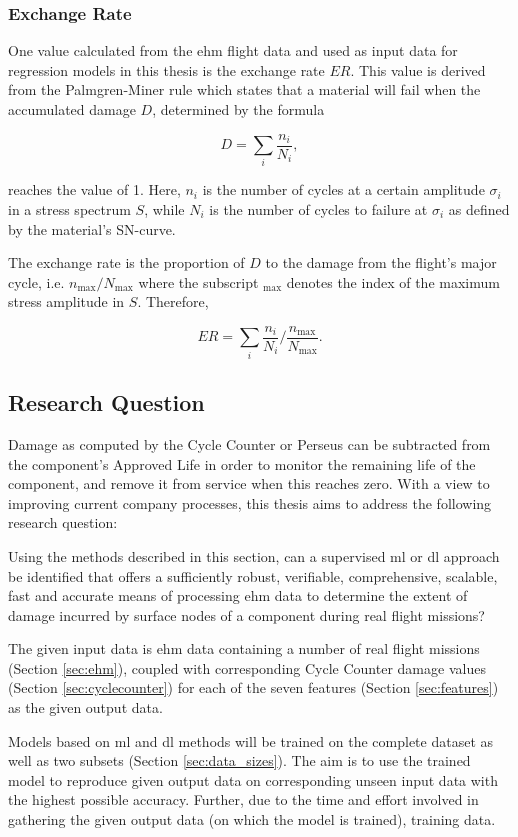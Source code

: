 \subsubsection{Exchange Rate}
One value calculated from the \ac{ehm} flight data and used as input data for regression models in this thesis is the exchange rate \(ER\). This value is derived from the Palmgren-Miner rule \cite[]{palmgren_lebensdauer_1924} which states that a material will fail when the accumulated damage \(D\), determined by the formula

\[
    D = \sum_{i}{\frac{n_i}{N_i}},
\]

reaches the value of 1. Here, \(n_i\) is the number of cycles at a certain amplitude \(\sigma_i\) in a stress spectrum \(S\), while \(N_i\) is the number of cycles to failure at \(\sigma_i\) as defined by the material's SN-curve.

The exchange rate is the proportion of \(D\) to the damage from the flight's major cycle, i.e. \(n_{\text{max}} / N_{\text{max}}\) where the subscript \({}_\text{max}\) denotes the index of the maximum stress amplitude in \(S\). Therefore,

\[
    ER = \sum_{i}{\frac{n_i}{N_i}} \Big/ {\frac{n_{\text{max}}}{N_{\text{max}}}}.
\]

\subsection{Research Question}
Damage as computed by the Cycle Counter or Perseus can be subtracted from the component's Approved Life in order to monitor the remaining life of the component, and remove it from service when this reaches zero. With a view to improving current company processes, this thesis aims to address the following research question:

Using the methods described in this section, can a supervised \ac{ml} or \ac{dl} approach be identified that offers a sufficiently robust, verifiable, comprehensive, scalable, fast and accurate means of processing \ac{ehm} data to determine the extent of damage incurred by surface nodes of a component during real flight missions?

The given input data is \ac{ehm} data containing a number of real flight missions (Section \ref{sec:ehm}), coupled with corresponding Cycle Counter damage values (Section \ref{sec:cyclecounter}) for each of the seven features (Section \ref{sec:features}) as the given output data.

Models based on \ac{ml} and \ac{dl} methods will be trained on the complete dataset as well as two subsets (Section \ref{sec:data_sizes}). The aim is to use the trained model to reproduce given output data on corresponding unseen input data with the highest possible accuracy. Further, due to the time and effort involved in gathering the given output data (on which the model is trained), training data.